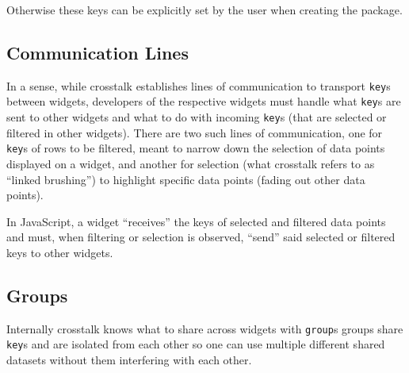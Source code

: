 \documentclass[
  10pt,
]{krantz}
\makeatletter
\newenvironment{Shaded}{\begin{snugshade}}{\end{snugshade}}
\newcommand{\CommentTok}[1]{\textcolor[rgb]{0.37,0.37,0.37}{\textit{#1}}}
\newcommand{\DataTypeTok}[1]{\textcolor[rgb]{0.27,0.27,0.27}{#1}}
\newcommand{\DecValTok}[1]{\textcolor[rgb]{0.06,0.06,0.06}{#1}}
\newcommand{\KeywordTok}[1]{\textcolor[rgb]{0.27,0.27,0.27}{\textbf{#1}}}
\newcommand{\NormalTok}[1]{#1}
\newcommand{\OperatorTok}[1]{\textcolor[rgb]{0.43,0.43,0.43}{\textbf{#1}}}
\newcommand{\StringTok}[1]{\textcolor[rgb]{0.5,0.5,0.5}{#1}}
\newenvironment{kframe}{%
\medskip{}
\setlength{\fboxsep}{.8em}
 \def\at@end@of@kframe{}%
 \ifinner\ifhmode%
  \def\at@end@of@kframe{\end{minipage}}%
  \begin{minipage}{\columnwidth}%
 \fi\fi%
 \def\FrameCommand##1{\hskip\@totalleftmargin \hskip-\fboxsep
 \colorbox{shadecolor}{##1}\hskip-\fboxsep
     \hskip-\linewidth \hskip-\@totalleftmargin \hskip\columnwidth}%
 \MakeFramed {\advance\hsize-\width
   \@totalleftmargin\z@ \linewidth\hsize
   \@setminipage}}%
 {\par\unskip\endMakeFramed%
 \at@end@of@kframe}
\renewenvironment{Shaded}{\begin{kframe}}{\end{kframe}}
\makeatother
\begin{document}
Otherwise these keys can be explicitly set by the user when creating the package.

\begin{Shaded}
\end{Shaded}

\hypertarget{linking-widgets-communication-lines}{%
\subsection{Communication Lines}\label{linking-widgets-communication-lines}}

In a sense, while crosstalk establishes lines of communication to transport \texttt{key}s between widgets, developers of the respective widgets must handle what \texttt{key}s are sent to other widgets and what to do with incoming \texttt{key}s (that are selected or filtered in other widgets). There are two such lines of communication, one for \texttt{key}s of rows to be filtered, meant to narrow down the selection of data points displayed on a widget, and another for selection (what crosstalk refers to as ``linked brushing'') to highlight specific data points (fading out other data points).

In JavaScript, a widget ``receives'' the keys of selected and filtered data points and must, when filtering or selection is observed, ``send'' said selected or filtered keys to other widgets.

\hypertarget{linking-widgets-groups}{%
\subsection{Groups}\label{linking-widgets-groups}}

Internally crosstalk knows what to share across widgets with \texttt{group}s groups share \texttt{key}s and are isolated from each other so one can use multiple different shared datasets without them interfering with each other.
\end{document}
